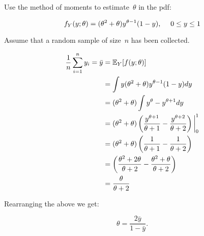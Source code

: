 \begin{problem}
   Use the method of moments to estimate~$\theta$ in the pdf:

  \begin{equation*}
    f_{Y}(y;\theta) = (\theta^{2} + \theta) y^{\theta - 1} (1 - y)\text{,} \hspace{0.5cm} 0 \leq y \leq 1
  \end{equation*}

  \noindent
  Assume that a random sample of size~$n$ has been collected.
\end{problem}

\begin{align*}
  \frac{1}{n} \sum_{i=1}^{n} y_i = \bar{y} &= \mathbb{E}_{Y}\lbrack f(y;\theta)\rbrack \\
                     &= \int  y(\theta^{2} + \theta) y^{\theta - 1} (1 - y) dy \\
                     &= (\theta^{2} + \theta) \int y^{\theta} - y^{\theta + 1} dy \\
                     &= (\theta^{2} + \theta) \left( \frac{y^{\theta + 1}}{\theta + 1} -\frac{y^{\theta + 2}}{\theta + 2} \right)\bigg\vert_{0}^{1} \\
                     &= (\theta^{2} + \theta) \left( \frac{1}{\theta + 1} - \frac{1}{\theta + 2} \right)\\
                     &= \left( \frac{\theta^{2} + 2\theta}{\theta + 2} - \frac{\theta^{2} + \theta}{\theta + 2} \right)\\
                     &= \frac{\theta}{\theta + 2}
\end{align*}

Rearranging the above we get:

\begin{equation}
  \theta = \boxed{\frac{2\bar{y}}{1 - \bar{y}}}.
\end{equation}
